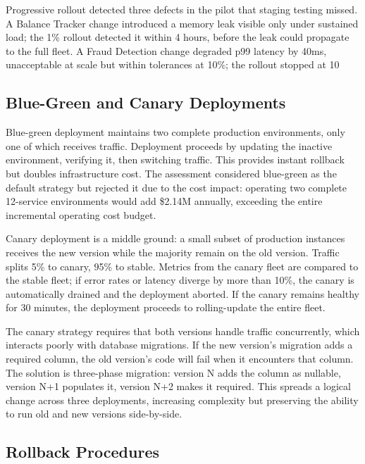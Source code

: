 Progressive rollout detected three defects in the pilot that staging testing missed. A Balance Tracker change introduced a memory leak visible only under sustained load; the 1\% rollout detected it within 4 hours, before the leak could propagate to the full fleet. A Fraud Detection change degraded p99 latency by 40ms, unacceptable at scale but within tolerances at 10\%; the rollout stopped at 10%

\subsection{Blue-Green and Canary Deployments}

Blue-green deployment maintains two complete production environments, only one of which receives traffic. Deployment proceeds by updating the inactive environment, verifying it, then switching traffic. This provides instant rollback but doubles infrastructure cost. The assessment considered blue-green as the default strategy but rejected it due to the cost impact: operating two complete 12-service environments would add \$2.14M annually, exceeding the entire incremental operating cost budget.

Canary deployment is a middle ground: a small subset of production instances receives the new version while the majority remain on the old version. Traffic splits 5\% to canary, 95\% to stable. Metrics from the canary fleet are compared to the stable fleet; if error rates or latency diverge by more than 10\%, the canary is automatically drained and the deployment aborted. If the canary remains healthy for 30 minutes, the deployment proceeds to rolling-update the entire fleet.

The canary strategy requires that both versions handle traffic concurrently, which interacts poorly with database migrations. If the new version's migration adds a required column, the old version's code will fail when it encounters that column. The solution is three-phase migration: version N adds the column as nullable, version N+1 populates it, version N+2 makes it required. This spreads a logical change across three deployments, increasing complexity but preserving the ability to run old and new versions side-by-side.

\subsection{Rollback Procedures}

